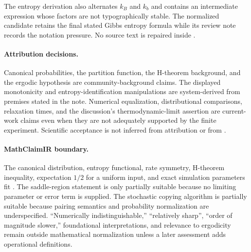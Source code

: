 The entropy derivation also alternates $k_B$ and $k_b$ and contains an intermediate expression whose factors are not typographically stable. The normalized candidate retains the final stated Gibbs entropy formula while its review note records the notation pressure. No source text is repaired inside .

\paragraph{Attribution decisions.}
Canonical probabilities, the partition function, the H-theorem background, and the ergodic hypothesis are community-background claims. The displayed monotonicity and entropy-identification manipulations are system-derived from premises stated in the note. Numerical equalization, distributional comparisons, relaxation times, and the discussion's thermodynamic-limit assertion are current-work claims even when they are not adequately supported by the finite experiment. Scientific acceptance is not inferred from attribution or from .

\paragraph{MathClaimIR boundary.}
The canonical distribution, entropy functional, rate symmetry, H-theorem inequality, expectation $1/2$ for a uniform input, and exact simulation parameters fit \MathClaimIR{}. The saddle-region statement is only partially suitable because no limiting parameter or error term is supplied. The stochastic copying algorithm is partially suitable because pairing semantics and probability normalization are underspecified. ``Numerically indistinguishable,'' ``relatively sharp'', ``order of magnitude slower,'' foundational interpretations, and relevance to ergodicity remain outside mathematical normalization unless a later assessment adds operational definitions.

